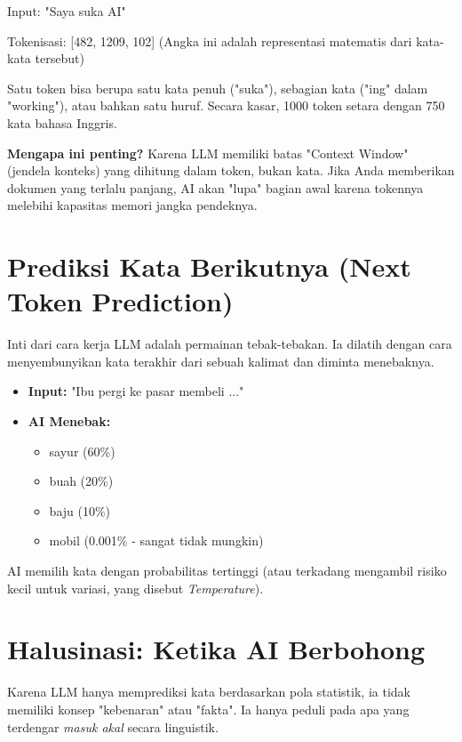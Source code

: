 \begin{codeblock}
Input: "Saya suka AI"

Tokenisasi: [482, 1209, 102]
(Angka ini adalah representasi matematis dari kata-kata tersebut)
\end{codeblock}

Satu token bisa berupa satu kata penuh ("suka"), sebagian kata ("ing" dalam "working"), atau bahkan satu huruf. Secara kasar, 1000 token setara dengan 750 kata bahasa Inggris.

\begin{tipbox}
\textbf{Mengapa ini penting?}
Karena LLM memiliki batas "Context Window" (jendela konteks) yang dihitung dalam token, bukan kata. Jika Anda memberikan dokumen yang terlalu panjang, AI akan "lupa" bagian awal karena tokennya melebihi kapasitas memori jangka pendeknya.
\end{tipbox}

\section{Prediksi Kata Berikutnya (Next Token Prediction)}

Inti dari cara kerja LLM adalah permainan tebak-tebakan. Ia dilatih dengan cara menyembunyikan kata terakhir dari sebuah kalimat dan diminta menebaknya.

\begin{itemize}
    \item \textbf{Input:} "Ibu pergi ke pasar membeli ..."
    \item \textbf{AI Menebak:}
    \begin{itemize}
        \item sayur (60\%)
        \item buah (20\%)
        \item baju (10\%)
        \item mobil (0.001\% - sangat tidak mungkin)
    \end{itemize}
\end{itemize}

AI memilih kata dengan probabilitas tertinggi (atau terkadang mengambil risiko kecil untuk variasi, yang disebut \textit{Temperature}).

\section{Halusinasi: Ketika AI Berbohong}

Karena LLM hanya memprediksi kata berdasarkan pola statistik, ia tidak memiliki konsep "kebenaran" atau "fakta". Ia hanya peduli pada apa yang terdengar \textit{masuk akal} secara linguistik.

